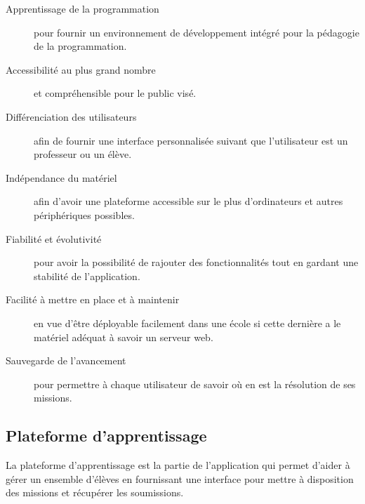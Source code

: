\begin{description}
  \item[Apprentissage de la programmation] pour fournir un environnement de développement intégré pour la pédagogie de la programmation.
  \item[Accessibilité au plus grand nombre] et compréhensible pour le public visé.
  \item[Différenciation des utilisateurs] afin de fournir une interface personnalisée suivant que l'utilisateur est un professeur ou un élève.
  \item[Indépendance du matériel] afin d'avoir une plateforme accessible sur le plus d'ordinateurs et autres périphériques possibles.
  \item[Fiabilité et évolutivité] pour avoir la possibilité de rajouter des fonctionnalités tout en gardant une stabilité de l'application.
  \item[Facilité à mettre en place et à maintenir] en vue d'être déployable facilement dans une école si cette dernière a le matériel adéquat à savoir un serveur web.
  \item[Sauvegarde de l'avancement] pour permettre à chaque utilisateur de savoir où en est la résolution de ses \glspl{mission}.
\end{description}

\subsection{Plateforme d'apprentissage}
La plateforme d'apprentissage est la partie de l'application qui permet d'aider à gérer un ensemble d'élèves en fournissant une interface pour mettre à disposition des \glspl{mission} et récupérer les soumissions.

